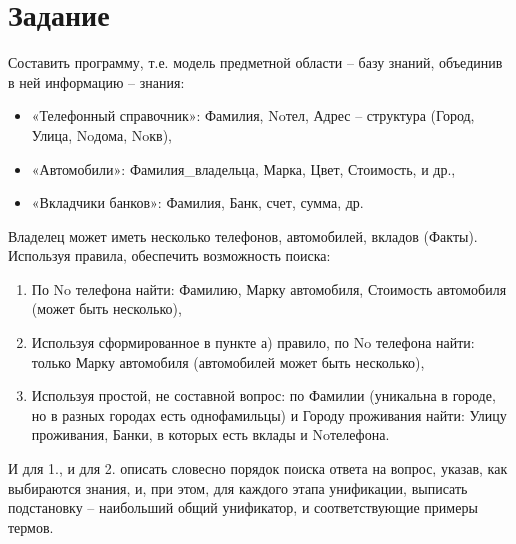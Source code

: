 \documentclass[12pt]{report}
\begin{document}
\section*{Задание}
Составить программу, т.е. модель предметной области – базу знаний, объединив в ней информацию – знания:
\begin{itemize}
    \item «Телефонный справочник»: Фамилия, Noтел, Адрес – структура (Город, Улица, Noдома, Noкв),
    \item «Автомобили»: Фамилия\_владельца, Марка, Цвет, Стоимость, и др.,
    \item «Вкладчики банков»: Фамилия, Банк, счет, сумма, др.
\end{itemize}
Владелец может иметь несколько телефонов, автомобилей, вкладов (Факты). Используя правила, обеспечить возможность поиска:
\begin{enumerate}

\item По No телефона найти: Фамилию, Марку автомобиля, Стоимость автомобиля (может быть несколько),
\item Используя сформированное в пункте а) правило, по No телефона найти: только Марку автомобиля (автомобилей может быть несколько),
\item Используя простой, не составной вопрос: по Фамилии (уникальна в городе, но в разных городах есть однофамильцы) и Городу проживания найти: Улицу проживания, Банки, в которых есть вклады и Noтелефона.
\end{enumerate}
И для 1., и для 2. описать словесно порядок поиска ответа на вопрос, указав, как выбираются знания, и, при этом, для каждого этапа унификации, выписать подстановку – наибольший общий унификатор, и соответствующие примеры термов.
\end{document}
